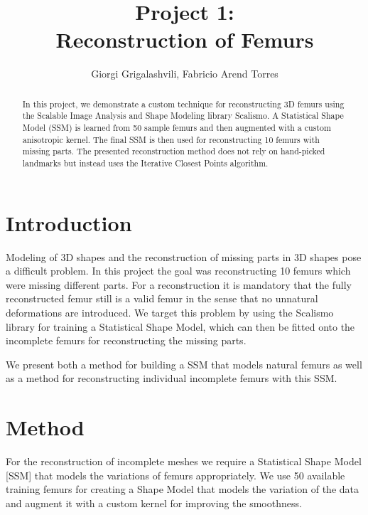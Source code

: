 \documentclass{article}
\begin{document}
	\author{Giorgi Grigalashvili, Fabricio Arend Torres}
		\title{Project 1:\\ Reconstruction of Femurs}
	\maketitle
	\begin{abstract}
		In this project, we demonstrate a custom technique for reconstructing 3D femurs using the Scalable Image Analysis and Shape Modeling library Scalismo. 
		A Statistical Shape Model (SSM) is learned from 50 sample femurs and then augmented with a custom anisotropic kernel. The final SSM is then used for reconstructing 10 femurs with missing parts. 
		The presented reconstruction method does not rely on hand-picked landmarks but instead uses the Iterative Closest Points algorithm.
	\end{abstract}
	

	\section{Introduction}
	
	Modeling of 3D shapes and the reconstruction of missing parts in 3D shapes pose a difficult problem. In this project the goal was reconstructing 10 femurs which were missing different parts. For a reconstruction it is mandatory that the fully reconstructed femur still is a valid femur in the sense that no unnatural deformations are introduced. We target this problem by using the Scalismo library for training a Statistical Shape Model, which can then be fitted onto the incomplete femurs for reconstructing the missing parts.
	
	We present both a method for building a SSM that models natural femurs as well as a method for reconstructing individual incomplete femurs with this SSM.
	

	\section{Method}
	For the reconstruction of incomplete meshes we require a Statistical Shape Model [SSM] that models the variations of femurs appropriately. We use 50 available training femurs for creating a Shape Model that models the variation of the data and augment it with a custom kernel for improving the smoothness.
	
\end{document}
